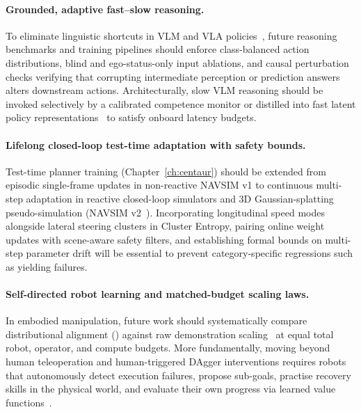 \paragraph{Grounded, adaptive fast--slow reasoning.}
To eliminate linguistic shortcuts in VLM and VLA policies~\cite{xie2025vlms,liu2026perturbot}, future reasoning benchmarks and training pipelines should enforce class-balanced action distributions, blind and ego-status-only input ablations, and causal perturbation checks verifying that corrupting intermediate perception or prediction answers alters downstream actions. Architecturally, slow VLM reasoning should be invoked selectively by a calibrated competence monitor or distilled into fast latent policy representations~\cite{hamdan2025eta,xie2026flare} to satisfy onboard latency budgets.

\paragraph{Lifelong closed-loop test-time adaptation with safety bounds.}
Test-time planner training (Chapter~\ref{ch:centaur}) should be extended from episodic single-frame updates in non-reactive NAVSIM v1 to continuous multi-step adaptation in reactive closed-loop simulators and 3D Gaussian-splatting pseudo-simulation (NAVSIM v2~\cite{cao2025pseudo}). Incorporating longitudinal speed modes alongside lateral steering clusters in Cluster Entropy, pairing online weight updates with scene-aware safety filters, and establishing formal bounds on multi-step parameter drift will be essential to prevent category-specific regressions such as yielding failures.

\paragraph{Self-directed robot learning and matched-budget scaling laws.}
In embodied manipulation, future work should systematically compare distributional alignment (\chiz) against raw demonstration scaling~\cite{bu2025agibot_iros} at equal total robot, operator, and compute budgets. More fundamentally, moving beyond human teleoperation and human-triggered DAgger interventions requires robots that autonomously detect execution failures, propose sub-goals, practise recovery skills in the physical world, and evaluate their own progress via learned value functions~\cite{chen2025robot}.

